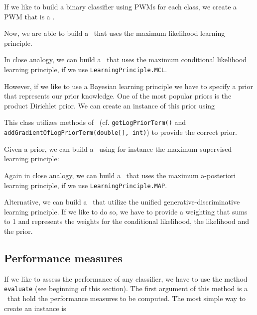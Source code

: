 If we like to build a binary classifier using PWMs for each class, we create a PWM that is a \DiffSM.

\addtocounter{off}{3}

Now, we are able to build a \GenDisMixClassifier~that uses the maximum likelihood learning principle.

\addtocounter{off}{3}

In close analogy, we can build a \GenDisMixClassifier~that uses the maximum conditional likelihood learning principle, if we use \lstinline+LearningPrinciple.MCL+.

However, if we like to use a Bayesian learning principle we have to specify a prior that represents our prior knowledge. One of the most popular priors is the product Dirichlet prior. We can create an instance of this prior using

\addtocounter{off}{3}

This class utilizes methods of \DiffSM~(cf. \lstinline+getLogPriorTerm()+ and \lstinline+addGradientOfLogPriorTerm(double[], int)+) to provide the correct prior.

Given a prior, we can build a \GenDisMixClassifier~using for instance the maximum supervised learning principle:

\addtocounter{off}{3}

Again in close analogy, we can build a \GenDisMixClassifier~that uses the maximum a-posteriori learning principle, if we use \lstinline+LearningPrinciple.MAP+.
 
Alternative, we can build a \GenDisMixClassifier~that utilize the unified generative-discriminative learning principle. If we like to do so, we have to provide a weighting that sums to 1 and represents the weights for the conditional likelihood, the likelihood and the prior.

\addtocounter{off}{3}

\subsection{Performance measures}\label{Performance}

If we like to assess the performance of any classifier, we have to use the method \lstinline+evaluate+ (see beginning of this section). The first argument of this method is a \PerformanceMeasureParameterSet~that hold the performance measures to be computed. The most simple way to create an instance is

\addtocounter{off}{9}

